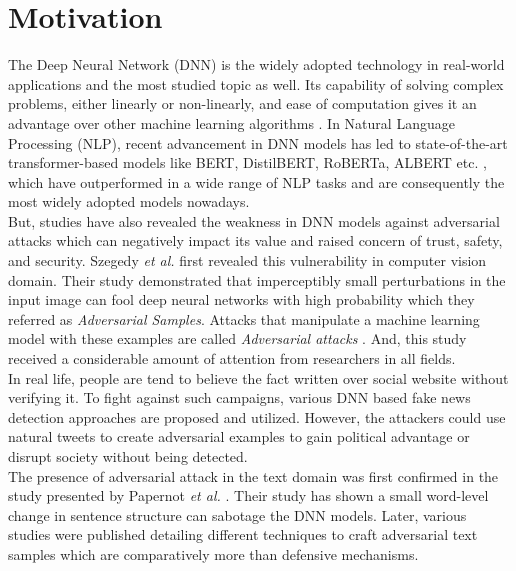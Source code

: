 \documentclass[%
	BCOR=8mm, %
	DIV=12,
	toc=bibliography, %
	toc=listof, %
	oneside, %
	egregdoesnotlikesansseriftitles, %
	]{scrbook}
\begin{document}
\section{Motivation}
The Deep Neural Network (DNN) is the widely  adopted technology in real-world applications and the most studied topic as well. Its capability of solving complex problems, either linearly or non-linearly, and ease of computation gives it an advantage over other machine learning algorithms \cite{huq_adversarial_2020-1}. In Natural Language Processing (NLP), recent advancement in DNN models  has led to state-of-the-art transformer-based models like BERT,  DistilBERT, RoBERTa, ALBERT etc. \cite{devlin_bert_2019-1,liu_roberta_2019-1,sanh_distilbert_2020,lan_albert_2020}, which have outperformed in a wide range of NLP tasks  and are consequently the most widely adopted models nowadays.\\
But, studies have also revealed the weakness in DNN models against adversarial attacks \cite{szegedy_intriguing_2014,yuan_adversarial_2018,akhtar_threat_2018,huq_adversarial_2020-1,zhang_adversarial_2019} which can negatively impact its value and raised concern of trust, safety, and security. Szegedy \textit{et al.} \cite{szegedy_intriguing_2014} first revealed this vulnerability in computer vision domain. Their study demonstrated that imperceptibly small perturbations in the input image can fool deep neural networks with high probability which they referred  as \textit{Adversarial Samples}. Attacks that manipulate a machine learning model with these examples are called \textit{Adversarial attacks} \cite{nicolae_adversarial_2019}. And, this study received a considerable amount of attention from researchers in all fields. \\
In real life, people are tend to believe the fact written over social website without verifying it. To fight against such campaigns, various DNN based fake news detection approaches are proposed and utilized.  However, the attackers could use natural tweets to create adversarial examples to gain political advantage or disrupt society without being detected. \\
The presence of adversarial attack in the text domain was first confirmed in the study presented by Papernot \textit{et al.} \cite{papernot_crafting_2016}. Their  study has shown  a small word-level change in sentence structure can sabotage the DNN models. Later, various studies were published detailing different techniques to craft adversarial text samples which are comparatively more than defensive mechanisms. \\
\end{document}

